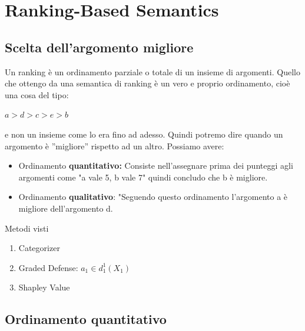    \chapter{Ranking-Based Semantics} \label{Ranking-Based Semantics}
    \section{Scelta dell'argomento migliore}
    Un ranking è un ordinamento parziale o totale di un insieme di argomenti. Quello che ottengo da una semantica di ranking è un vero e proprio ordinamento, cioè una cosa del tipo:
    \begin{center}
        $a > d > c > e >b$
    \end{center}
    e non un insieme come lo era fino ad adesso. Quindi potremo dire quando un argomento è ”migliore” rispetto ad un altro. Possiamo avere:
    \begin{itemize}
        \item Ordinamento \textbf{quantitativo:} Consiste nell'assegnare prima dei punteggi agli argomenti come "a vale 5, b vale 7" quindi concludo che b è migliore.
        \item Ordinamento \textbf{qualitativo}: "Seguendo questo ordinamento l'argomento a è migliore dell'argomento d.
    \end{itemize}
    \begin{center}
        Metodi visti
    \end{center}
    \begin{enumerate}
        \item Categorizer
        \item Graded Defense: $a_1 \in d^1_{1} (X_1)$
        \item Shapley Value
    \end{enumerate}
    \section{Ordinamento quantitativo}
